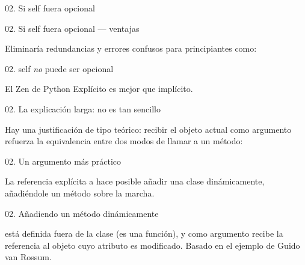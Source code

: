 \begin{frame}{02. Si self fuera opcional}
  \small
\end{frame}

\begin{frame}{02. Si self fuera opcional — ventajas}
  \begin{center}
    \small
    Eliminaría redundancias y errores confusos para principiantes como:
  \end{center}

  \footnotesize
  \vspace{0.10cm}
\end{frame}

\begin{frame}{02. self \textit{no} puede ser opcional}
  \begin{block}{\centering El Zen de Python}
    \Large
    \centering
    Explícito es mejor que implícito.
  \end{block}
\end{frame}

\begin{frame}{02. La explicación larga: no es tan sencillo}
  \begin{center}
    \footnotesize
    Hay una justificación de tipo teórico: recibir el objeto actual
    como argumento refuerza la equivalencia entre dos modos de llamar
    a un método:
  \end{center}

  \scriptsize
\end{frame}

\begin{frame}{02. Un argumento más práctico}
  \begin{block}{}
    \large
    \centering
    La referencia explícita a  hace posible añadir una
    clase dinámicamente, añadiéndole un método sobre la marcha.
  \end{block}
\end{frame}

\begin{frame}{02. Añadiendo un método dinámicamente}
  \footnotesize

  \vspace{-0.5cm}
  \begin{center}
     está definida fuera de la clase (es una
    función), y como argumento recibe la referencia al objeto cuyo
    atributo  es modificado. Basado en el ejemplo de
    Guido van Rossum.
  \end{center}
\end{frame}

